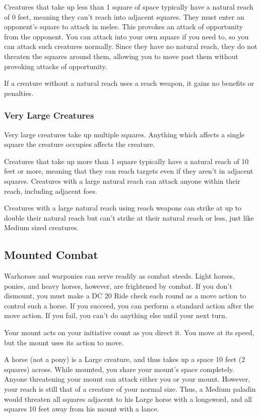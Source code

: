  Creatures that take up less than 1 square of space typically have a natural reach of 0 feet, meaning they can't reach into adjacent squares. They must enter an opponent's square to attack in melee. This provokes an attack of opportunity from the opponent. You can attack into your own square if you need to, so you can attack such creatures normally. Since they have no natural reach, they do not threaten the squares around them, allowing you to move past them without provoking attacks of opportunity.

If a creature without a natural reach uses a reach weapon, it gains no benefits or penalties.

\subsubsection{Very Large Creatures}
 Very large creatures take up multiple squares. Anything which affects a single square the creature occupies affects the creature. 

 Creatures that take up more than 1 square typically have a natural reach of 10 feet or more, meaning that they can reach targets even if they aren't in adjacent squares. Creatures with a large natural reach can attack anyone within their reach, including adjacent foes.

Creatures with a large natural reach using reach weapons can strike at up to double their natural reach but can't strike at their natural reach or less, just like Medium sized creatures.

\subsection{Mounted Combat}
 Warhorses and warponies can serve readily as combat steeds. Light horses, ponies, and heavy horses, however, are frightened by combat. If you don't dismount, you must make a DC 20 Ride check each round as a move action to control such a horse. If you succeed, you can perform a standard action after the move action. If you fail, you can't do anything else until your next turn.

Your mount acts on your initiative count as you direct it. You move at its speed, but the mount uses its action to move.

 A horse (not a pony) is a Large creature, and thus takes up a space 10 feet (2 squares) across. While mounted, you share your mount's space completely. Anyone threatening your mount can attack either you or your mount. However, your reach is still that of a creature of your normal size. Thus, a Medium paladin would threaten all squares adjacent to his Large horse with a longsword, and all squares 10 feet away from his mount with a lance.

